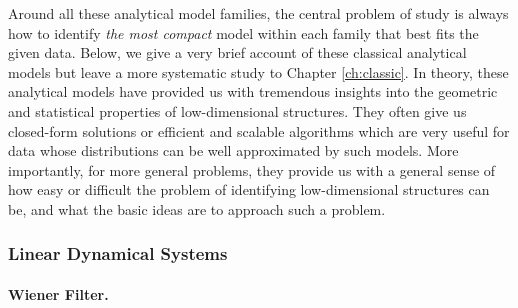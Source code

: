 \documentclass[\toplevelprefix/book-main.tex]{subfiles}
\begin{document}
Around all these analytical model families, the central problem of study is always how to identify {\em the most compact} model within each family that best fits the given data. Below, we give a very brief account of these classical analytical models but leave a more systematic study to Chapter \ref{ch:classic}. In theory, these analytical models have provided us with tremendous insights into the geometric and statistical properties of low-dimensional structures. They often give us closed-form solutions or efficient and scalable algorithms which are very useful for data whose distributions can be well approximated by such models. More importantly, for more general problems, they provide us with a general sense of how easy or difficult the problem of identifying low-dimensional structures can be, and what the basic ideas are to approach such a problem.




\subsubsection{Linear Dynamical Systems}
\label{sec:linear-systems}

\paragraph{Wiener Filter.}
\end{document}
